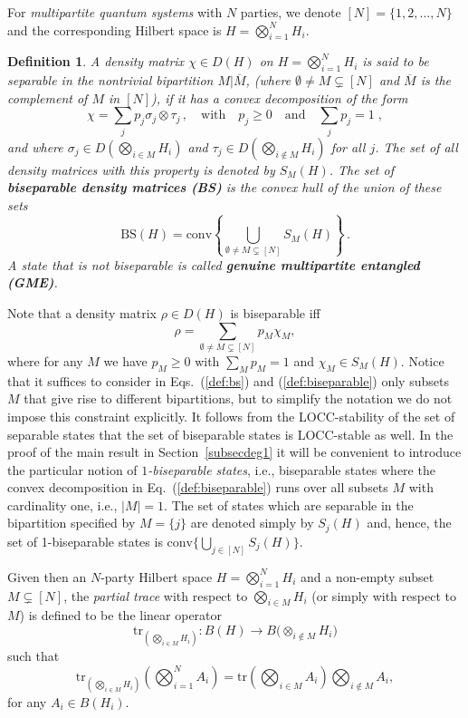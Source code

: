 \documentclass[a4paper,onecolumn,accepted=2024-12-14]{quantumarticle}
\theoremstyle{plain}
\newtheorem{definition}[theorem]{Definition}%
\def\tr{\mathrm{tr}}
\newcommand{\quadtext}[1]{\quad\text{#1}\quad}
\begin{document}
For \textit{multipartite quantum systems} with $N$ parties, we denote
$[N]=\{1,2,\ldots,N\}$ and the corresponding Hilbert space is $H=\bigotimes_{i=1}^N H_i$.
\begin{definition}
A density matrix $\chi\in D(H)$ on $H=\bigotimes_{i=1}^N H_i$ is said to be separable in the nontrivial
bipartition $M|\overline{M}$, (where $\emptyset\not=M\subsetneq[N]$ and
$\overline{M}$ is the complement of $M$ in $[N]$),
if it has a convex decomposition of the form
\[
 \chi=\sum_{j}p_j\sigma_j\otimes\tau_j\,,
 \quadtext{with} p_j\geq0 \quadtext{and}\sum_jp_j=1\;,
\]
and where $\sigma_j\in D\left(\bigotimes_{i\in M}H_i\right)$ and
$\tau_j\in D\left(\bigotimes_{i\notin M}H_i\right)$ for all $j$.
The set of all density matrices with this property is denoted by $S_M(H)$. The set of \textbf{biseparable density matrices (BS)}
is the convex hull of the union of these sets
\begin{equation}\label{def:bs}
\mathrm{BS}(H)=\mathrm{conv}\left\{\bigcup_{\emptyset\neq M\subsetneq[N]}S_M(H)\right\}\,.
\end{equation}
A state that is not biseparable is called \textbf{genuine multipartite entangled (GME)}.
\end{definition}
Note that a density matrix $\rho\in D(H)$ is biseparable iff
\begin{equation}\label{def:biseparable}
\rho=\sum_{\emptyset\neq M\subsetneq[N]}p_M\chi_M,
\end{equation}
where for any $M$ we have $p_M\geq0$ with $\sum_Mp_M=1$ and $\chi_M\in S_M(H)$. Notice that it suffices to consider in Eqs.~(\ref{def:bs}) and (\ref{def:biseparable}) only subsets $M$ that give rise to different bipartitions, but to simplify the notation we do not impose this constraint explicitly. It follows from the LOCC-stability of the set of separable states that the set of biseparable states is LOCC-stable as well.
In the proof of the main result in Section~\ref{subsecdeg1} it will be convenient to introduce the particular notion of \textit{$1$-biseparable states}, i.e., biseparable states where the convex decomposition in
Eq.~(\ref{def:biseparable}) runs over all subsets $M$ with cardinality one, i.e., $|M|=1$. The set of states which are separable in the bipartition
specified by $M=\{j\}$ are denoted simply by $S_j(H)$ and, hence, the set of 1-biseparable states is $\mathrm{conv}\{\bigcup_{j\in[N]}S_j(H)\}$.

Given then an $N$-party Hilbert space $H=\bigotimes_{i=1}^N H_i$ and
a non-empty subset $M\subsetneq[N]$, the \textit{partial trace} with respect to $\bigotimes_{i\in M}H_i$ (or simply with respect to $M$) is defined to be the linear operator
\begin{equation}
\tr_{(\bigotimes_{i\in M}H_i)}\colon B(H)\to
B\big(\otimes_{i\notin M}H_i\big)
\end{equation}
such that
\begin{equation}
\tr_{\left(\bigotimes_{i\in M}H_i\right)}\left(\bigotimes_{i=1}^NA_i\right)=\tr\left(\bigotimes_{i\in M}A_i\right)\bigotimes_{i\notin M}A_i,
\end{equation}
for any $A_i\in B(H_i)$.
\end{document}
